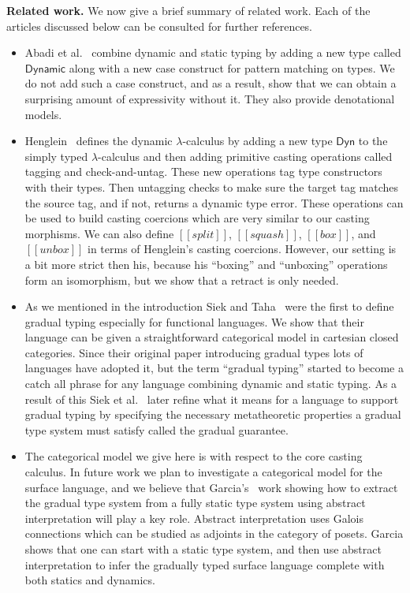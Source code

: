 \textbf{Related work.}  We now give a brief summary of related
work. Each of the articles discussed below can be consulted for
further references.
\begin{itemize}
\item Abadi et al.~\cite{Abadi:1989} combine dynamic and static typing
  by adding a new type called $\mathsf{Dynamic}$ along with a new case
  construct for pattern matching on types.  We do not add such a case
  construct, and as a result, show that we can obtain a surprising
  amount of expressivity without it.  They also provide denotational
  models.

\item Henglein~\cite{Henglein:1994} defines the dynamic
  $\lambda$-calculus by adding a new type $\mathsf{Dyn}$ to the simply
  typed $\lambda$-calculus and then adding primitive casting
  operations called tagging and check-and-untag.  These new operations
  tag type constructors with their types.  Then untagging checks to
  make sure the target tag matches the source tag, and if not, returns
  a dynamic type error.  These operations can be used to build casting
  coercions which are very similar to our casting morphisms. We can
  also define $[[split]]$, $[[squash]]$, $[[box]]$, and $[[unbox]]$ in
  terms of Henglein's casting coercions.  However, our setting is a
  bit more strict then his, because his ``boxing'' and ``unboxing''
  operations form an isomorphism, but we show that a retract is only
  needed.

\item As we mentioned in the introduction Siek and
  Taha~\cite{Siek:2006} were the first to define gradual typing
  especially for functional languages.  We show that their language
  can be given a straightforward categorical model in cartesian closed
  categories.  Since their original paper introducing gradual types
  lots of languages have adopted it, but the term ``gradual typing''
  started to become a catch all phrase for any language combining
  dynamic and static typing.  As a result of this Siek et
  al.~\cite{Siek:2015} later refine what it means for a language to
  support gradual typing by specifying the necessary metatheoretic
  properties a gradual type system must satisfy called the gradual
  guarantee.

\item The categorical model we give here is with respect to the core
  casting calculus.  In future work we plan to investigate a
  categorical model for the surface language, and we believe that
  Garcia's~\cite{Garcia:2016} work showing how to extract the gradual
  type system from a fully static type system using abstract
  interpretation will play a key role.  Abstract interpretation uses
  Galois connections which can be studied as adjoints in the category
  of posets.  Garcia shows that one can start with a static type
  system, and then use abstract interpretation to infer the gradually
  typed surface language complete with both statics and dynamics.

\end{itemize}


